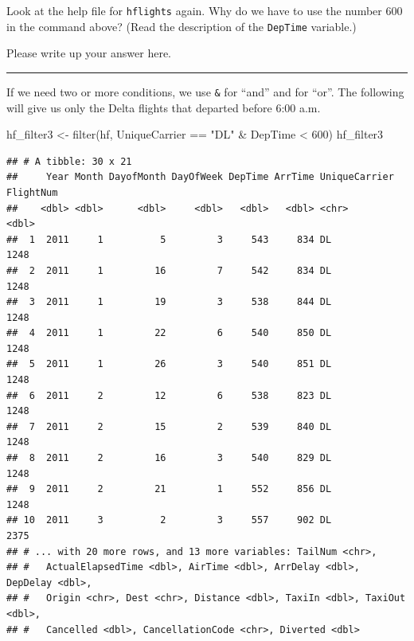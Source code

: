 \documentclass[
]{book}
\newenvironment{Shaded}{\begin{snugshade}}{\end{snugshade}}
\newcommand{\DecValTok}[1]{\textcolor[rgb]{0.00,0.00,0.81}{#1}}
\newcommand{\FunctionTok}[1]{\textcolor[rgb]{0.00,0.00,0.00}{#1}}
\newcommand{\NormalTok}[1]{#1}
\newcommand{\OtherTok}[1]{\textcolor[rgb]{0.56,0.35,0.01}{#1}}
\newcommand{\SpecialCharTok}[1]{\textcolor[rgb]{0.00,0.00,0.00}{#1}}
\newcommand{\StringTok}[1]{\textcolor[rgb]{0.31,0.60,0.02}{#1}}
\begin{document}
Look at the help file for \texttt{hflights} again. Why do we have to use the number 600 in the command above? (Read the description of the \texttt{DepTime} variable.)

Please write up your answer here.

\begin{center}\rule{0.5\linewidth}{0.5pt}\end{center}

If we need two or more conditions, we use \texttt{\&} for ``and'' and \texttt{\textbar{}} for ``or''. The following will give us only the Delta flights that departed before 6:00 a.m.

\begin{Shaded}
\begin{Highlighting}[]
\NormalTok{hf\_filter3 }\OtherTok{\textless{}{-}} \FunctionTok{filter}\NormalTok{(hf, UniqueCarrier }\SpecialCharTok{==} \StringTok{"DL"} \SpecialCharTok{\&}\NormalTok{ DepTime }\SpecialCharTok{\textless{}} \DecValTok{600}\NormalTok{)}
\NormalTok{hf\_filter3}
\end{Highlighting}
\end{Shaded}

\begin{verbatim}
## # A tibble: 30 x 21
##     Year Month DayofMonth DayOfWeek DepTime ArrTime UniqueCarrier FlightNum
##    <dbl> <dbl>      <dbl>     <dbl>   <dbl>   <dbl> <chr>             <dbl>
##  1  2011     1          5         3     543     834 DL                 1248
##  2  2011     1         16         7     542     834 DL                 1248
##  3  2011     1         19         3     538     844 DL                 1248
##  4  2011     1         22         6     540     850 DL                 1248
##  5  2011     1         26         3     540     851 DL                 1248
##  6  2011     2         12         6     538     823 DL                 1248
##  7  2011     2         15         2     539     840 DL                 1248
##  8  2011     2         16         3     540     829 DL                 1248
##  9  2011     2         21         1     552     856 DL                 1248
## 10  2011     3          2         3     557     902 DL                 2375
## # ... with 20 more rows, and 13 more variables: TailNum <chr>,
## #   ActualElapsedTime <dbl>, AirTime <dbl>, ArrDelay <dbl>, DepDelay <dbl>,
## #   Origin <chr>, Dest <chr>, Distance <dbl>, TaxiIn <dbl>, TaxiOut <dbl>,
## #   Cancelled <dbl>, CancellationCode <chr>, Diverted <dbl>
\end{verbatim}
\end{document}
